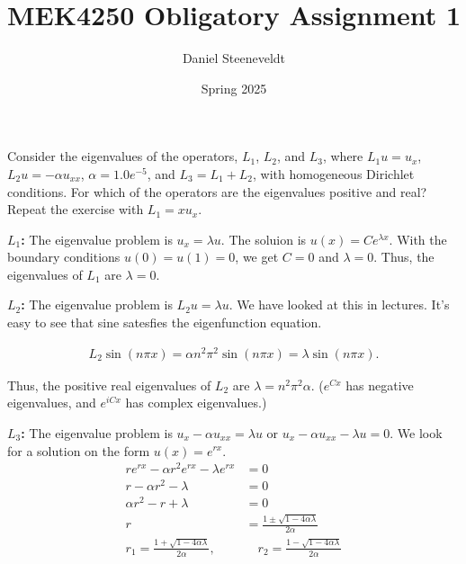 \documentclass[a4paper,12pt]{article}
\title{
    MEK4250 Obligatory Assignment 1
}
\author{Daniel Steeneveldt}
\date{Spring 2025}
\theoremstyle{exerciseStyle}
\theoremstyle{solutionStyle}
\begin{document}
\maketitle




\begin{exercise}{5.6}
    Consider the eigenvalues of the operators, $L_1$, $L_2$, and $L_3$, where $L_1 u = u_x$, $L_2 u = -\alpha u_{xx}$, $\alpha = 1.0 e^{-5}$, and $L_3 = L_1 + L_2$, with homogeneous Dirichlet conditions.
    For which of the operators are the eigenvalues positive and real?
    Repeat the exercise with $L_1 = x u_x$.
\end{exercise}

\begin{solution}{5.6}

    \medskip\noindent\textbf{$L_1$:}
    The eigenvalue problem is $u_x = \lambda u$.
    The soluion is $u(x) = C e^{\lambda x}$.
    With the boundary conditions $u(0) = u(1) = 0$, we get $C = 0$ and $\lambda = 0$.
    Thus, the eigenvalues of $L_1$ are $\lambda = 0$.


    \medskip\noindent\textbf{$L_2$:}
    The eigenvalue problem is $L_2 u = \lambda u$. We have looked at this in lectures.
    It's easy to see that sine satesfies the eigenfunction equation.

    \begin{align*}
        L_2 \sin(n \pi x) = \alpha n^2 \pi^2  \sin(n \pi x) = \lambda \sin(n \pi x).
    \end{align*}%

    Thus, the positive real eigenvalues of $L_2$ are $\lambda = n^2 \pi^2 \alpha$. ($e^{C x}$ has
    negative eigenvalues, and $e^{i C x}$ has complex eigenvalues.)

    \medskip\noindent\textbf{$L_3$:}
    The eigenvalue problem is
    $u_x - \alpha u_{xx} = \lambda u$ or $u_x - \alpha u_{xx} - \lambda u = 0$.
    We look for a solution on the form $u(x) = e^{r x}$.
    \begin{align*}
        r e^{r x} - \alpha r^2 e^{r x} - \lambda e^{r x}        & = 0                                                  \\
        r - \alpha r^2 - \lambda                                & = 0                                                  \\
        \alpha r^2 - r + \lambda                                & = 0                                                  \\
        r                                                       & = \frac{1 \pm \sqrt{1 - 4 \alpha \lambda}}{2 \alpha} \\
        r_1 = \frac{1 + \sqrt{1 - 4 \alpha \lambda}}{2 \alpha}, &
        \quad r_2 = \frac{1 - \sqrt{1 - 4 \alpha \lambda}}{2 \alpha}                                                   \\
    \end{align*}%


\end{solution}
\end{document}

